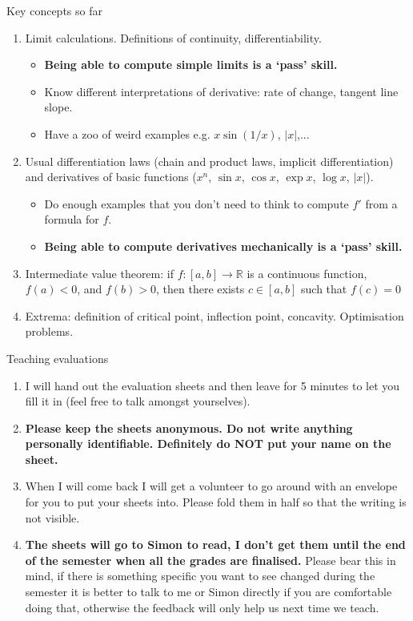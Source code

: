 \documentclass{beamer}
\newcommand{\R}{\mathbb{R}}
\begin{document}
\begin{frame}{Key concepts so far}
\begin{enumerate}
  \item Limit calculations. Definitions of continuity, differentiability.
    \begin{itemize}
      \item \textbf{Being able to compute simple limits is a `pass' skill.}
      \item Know different interpretations of derivative: rate of change, tangent line slope.
      \item Have a zoo of weird examples e.g. $ x\sin(1/x) $, $ \lvert x \rvert $,...
    \end{itemize}
  \item Usual differentiation laws (chain and product laws, implicit differentiation) and derivatives of basic functions ($ x^n $, $ \sin x $, $ \cos x  $, $ \exp x $, $ \log x $, $ \lvert x \rvert $).
    \begin{itemize}
      \item Do enough examples that you don't need to think to compute $ f' $ from a formula for $ f $.
      \item \textbf{Being able to compute derivatives mechanically is a `pass' skill.}
    \end{itemize}
  \item Intermediate value theorem: if $ f : [a,b] \to \R $ is a continuous function, $ f(a) < 0 $, and $ f(b) > 0 $, then there exists $ c \in [a,b] $ such that $ f(c) = 0 $
  \item Extrema: definition of critical point, inflection point, concavity. Optimisation problems.
\end{enumerate}
\end{frame}


\begin{frame}{Teaching evaluations}
\begin{enumerate}
  \item I will hand out the evaluation sheets and then leave for 5 minutes to let you fill it in (feel free to talk amongst yourselves).
  \item \textbf{Please keep the sheets anonymous. Do not write anything personally identifiable. Definitely do NOT put your name on the sheet.}
  \item When I will come back I will get a volunteer to go around with an envelope for you to put your sheets into. Please fold them in half
  so that the writing is not visible.
  \item \textbf{The sheets will go to Simon to read, I don't get them until the end of the semester when all the grades are finalised.} Please bear this in mind,
  if there is something specific you want to see changed during the semester it is better to talk to me or Simon directly if you are comfortable doing that, otherwise
  the feedback will only help us next time we teach.
\end{enumerate}
\end{frame}
\end{document}
